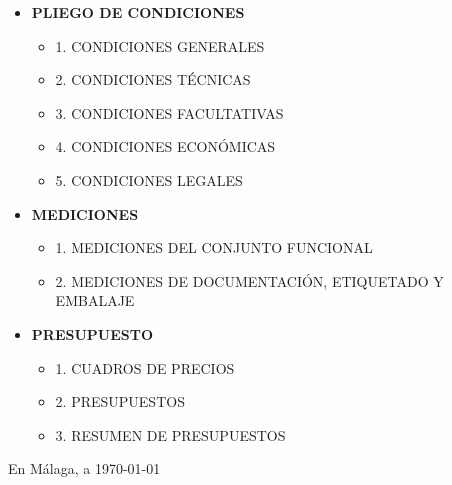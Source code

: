 \documentclass[11pt,a4paper]{article}
\begin{document}
\begin{itemize}[label={}, leftmargin=0cm, itemsep=1.2em]
\begin{itemize}[label=\color{ArthroTeal}\textbullet, leftmargin=0.6cm, itemsep=0.5em, topsep=0.3cm]
\vspace{0.5cm}

    \item \Large\textbf{\color{ArthroNavy}PLIEGO DE CONDICIONES} 
    \begin{itemize}[label=\color{ArthroTeal}\textbullet, leftmargin=0.6cm, itemsep=0.3em, topsep=0.3cm]
        \normalsize
        \item 1. CONDICIONES GENERALES
        \item 2. CONDICIONES TÉCNICAS
        \item 3. CONDICIONES FACULTATIVAS
        \item 4. CONDICIONES ECONÓMICAS
        \item 5. CONDICIONES LEGALES
    \end{itemize}

\vspace{0.5cm}

    \item \Large\textbf{\color{ArthroNavy}MEDICIONES} 
    \begin{itemize}[label=\color{ArthroTeal}\textbullet, leftmargin=0.6cm, itemsep=0.3em, topsep=0.3cm]
        \normalsize
        \item 1. MEDICIONES DEL CONJUNTO FUNCIONAL 
        \item 2. MEDICIONES DE DOCUMENTACIÓN, ETIQUETADO Y EMBALAJE
    \end{itemize}

\vspace{0.5cm}

\newpage
    \item \Large\textbf{\color{ArthroNavy}PRESUPUESTO} 
    \begin{itemize}[label=\color{ArthroTeal}\textbullet, leftmargin=0.6cm, itemsep=0.3em, topsep=0.3cm]
        \normalsize
        \item 1. CUADROS DE PRECIOS
        \item 2. PRESUPUESTOS
        \item 3. RESUMEN DE PRESUPUESTOS
    \end{itemize}

\end{itemize}

\vspace{2cm}

\noindent\begin{minipage}{\textwidth}
    \fontsize{10.5pt}{12.5pt}\selectfont
    \begin{flushright}
        En Málaga, a \today
    \end{flushright}
    \vspace{1.5cm}


\end{minipage}
\end{itemize}
\end{document}

